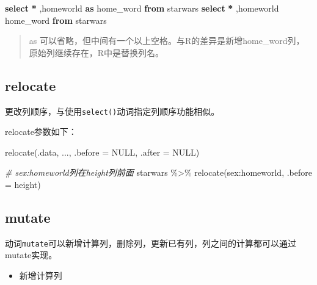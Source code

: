 \documentclass[
]{book}
\newenvironment{Shaded}{\begin{snugshade}}{\end{snugshade}}
\newcommand{\AttributeTok}[1]{\textcolor[rgb]{0.77,0.63,0.00}{#1}}
\newcommand{\CommentTok}[1]{\textcolor[rgb]{0.56,0.35,0.01}{\textit{#1}}}
\newcommand{\ConstantTok}[1]{\textcolor[rgb]{0.00,0.00,0.00}{#1}}
\newcommand{\FunctionTok}[1]{\textcolor[rgb]{0.00,0.00,0.00}{#1}}
\newcommand{\KeywordTok}[1]{\textcolor[rgb]{0.13,0.29,0.53}{\textbf{#1}}}
\newcommand{\NormalTok}[1]{#1}
\newcommand{\OperatorTok}[1]{\textcolor[rgb]{0.81,0.36,0.00}{\textbf{#1}}}
\newcommand{\SpecialCharTok}[1]{\textcolor[rgb]{0.00,0.00,0.00}{#1}}
\providecommand{\tightlist}{%
  \setlength{\itemsep}{0pt}\setlength{\parskip}{0pt}}
\begin{document}
\begin{Shaded}
\begin{Highlighting}[]
\KeywordTok{select} \OperatorTok{*}\NormalTok{ ,homeworld }\KeywordTok{as}\NormalTok{ home\_word }\KeywordTok{from}\NormalTok{ starwars }
\KeywordTok{select} \OperatorTok{*}\NormalTok{ ,homeworld  home\_word }\KeywordTok{from}\NormalTok{ starwars }
\end{Highlighting}
\end{Shaded}

\begin{quote}
as 可以省略，但中间有一个以上空格。与R的差异是新增home\_word列，原始列继续存在，R中是替换列名。
\end{quote}

\hypertarget{dplyr-relocate}{%
\subsection{relocate}\label{dplyr-relocate}}

更改列顺序，与使用\texttt{select()}动词指定列顺序功能相似。

relocate参数如下：

\begin{Shaded}
\begin{Highlighting}[]
\FunctionTok{relocate}\NormalTok{(.data, ..., }\AttributeTok{.before =} \ConstantTok{NULL}\NormalTok{, }\AttributeTok{.after =} \ConstantTok{NULL}\NormalTok{)}
\end{Highlighting}
\end{Shaded}

\begin{Shaded}
\begin{Highlighting}[]
\CommentTok{\# sex:homeworld列在height列前面}
\NormalTok{starwars }\SpecialCharTok{\%\textgreater{}\%} \FunctionTok{relocate}\NormalTok{(sex}\SpecialCharTok{:}\NormalTok{homeworld, }\AttributeTok{.before =}\NormalTok{ height)}
\end{Highlighting}
\end{Shaded}

\hypertarget{dplyr-mutate}{%
\subsection{mutate}\label{dplyr-mutate}}

动词\texttt{mutate}可以新增计算列，删除列，更新已有列，列之间的计算都可以通过mutate实现。

\begin{itemize}
\tightlist
\item
  新增计算列
\end{itemize}
\end{document}
